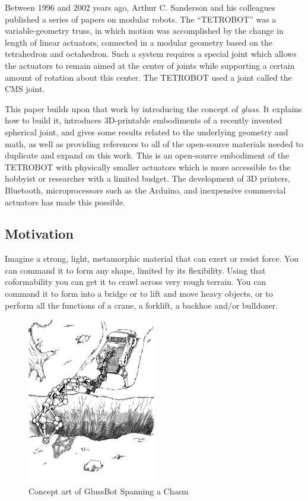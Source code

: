 \documentclass[11pt]{article}
\begin{document}
Between 1996 and 2002 years ago, Arthur C. Sanderson and his colleagues published a series of
papers\cite{sanderson1996modular,lee2002dynamic,lee1999dynamics} on modular robots.
The ``TETROBOT'' was a variable-geometry truss, in which motion was accomplished by the change
in length of linear actuators, connected in a modular geometry based on the tetrahedron and octahedron.  Such a system
requires a special joint which allows the actuators to remain aimed at the center of joints while supporting
a certain amount of rotation about this center.  The TETROBOT used a joint called the CMS joint.

This paper builds upon that work by introducing the concept of \emph{gluss}. It explains how to build it,
introduces 3D-printable embodiments of
a recently invented spherical joint\cite{song2003spherical}, 
and gives some results related to the underlying geometry and math, as well as providing
references to all of the open-source materials needed to duplicate and expand on this work. This is an
open-source embodiment of the TETROBOT with physically smaller actuators which is more accessible to the
hobbyist or researcher with a limited budget.  The development of 3D printers, Bluetooth, microprocessors
such as the Arduino, and inexpensive commercial actuators has made this possible.

\subsection{Motivation}

Imagine a strong, light, metamorphic material that can exert or resist force.
You can command it to form any shape, limited by its flexibility.
Using that coformability you can get it to crawl across very rough terrain.
You can command it to form into a bridge or to lift and move heavy objects,
or to perform all the functions of a crane, a forklift, a backhoe and/or bulldozer.

\begin{figure}[H]
  \centering
    \includegraphics[width=0.5\textwidth]{figures/robotTruckChasm.png}
    \caption[Concept art of GlussBot Spanning a Chasm]{Concept art of GlussBot Spanning a Chasm}
      \label{chasmspan}
\end{figure}
\end{document}
